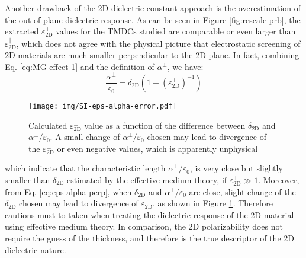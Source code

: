 \documentclass[manuscript=suppinfo,email=true,hyperref=true,keywords=false]{achemso}
\begin{document}
Another drawback of the 2D dielectric constant approach is the
overestimation of the out-of-plane dielectric response. As can be seen
in Figure \ref{fig:rescale-prb}, the extracted
$\varepsilon_{\mathrm{2D}}^{\perp}$ values for the TMDCs studied
are comparable or even larger than
$\varepsilon_{\mathrm{2D}}^{\parallel}$, which does not agree with the
physical picture that electrostatic screening of 2D materials are much
smaller perpendicular to the 2D plane. In fact, combining
Eq. \ref{eq:MG-effect-1} and the definition of $\alpha^{\perp}$, we
have:
\begin{equation}
  \label{eq:eps-alpha-perp}
  \frac{\alpha^{\perp}}{\varepsilon_{0}} = \delta_{\mathrm{2D}}(1 - (\varepsilon_{\mathrm{2D}}^{\perp})^{-1})
\end{equation}

\begin{figure}[htbp]
  \centering
  \texttt{[image: img/SI-eps-alpha-error.pdf]}
  \caption{Calculated $\varepsilon_{\mathrm{2D}}^{\perp}$ value as a
    function of the difference between $\delta_{\mathrm{2D}}$ and
    $\alpha^{\perp}/\varepsilon_{0}$. A small change of
    $\alpha^{\perp}/\varepsilon_{0}$ chosen may lead to divergence of
    the $\varepsilon_{\mathrm{2D}}^{\perp}$ or even negative values,
    which is apparently unphysical}
  \label{fig:eps-alpha-error}
\end{figure}

which indicate that the characteristic length
$\alpha^{\perp}/\varepsilon_{0}$, is very close but slightly smaller
than $\delta_{\mathrm{2D}}$ estimated by the effective medium theory,
if $\varepsilon^{\perp}_{\mathrm{2D}} \gg 1$. Moreover, from
Eq. \ref{eq:eps-alpha-perp}, when $\delta_{\mathrm{2D}}$ and
$\alpha^{\perp}/\varepsilon_{0}$ are close, slight change of the
$\delta_{\mathrm{2D}}$ chosen may lead to divergence of
$\varepsilon_{\mathrm{2D}}^{\perp}$, as shown in Figure
\ref{fig:eps-alpha-error}. Therefore cautions must to taken when
treating the dielectric response of the 2D material using effective
medium theory. In comparison, the 2D polarizability does not require
the guess of the thickness, and therefore is the true descriptor of
the 2D dielectric nature.
\end{document}
